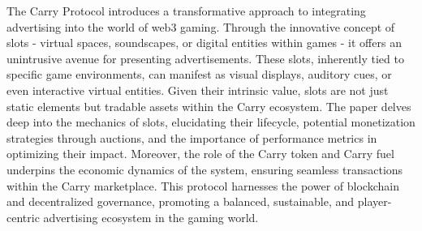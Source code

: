 \documentclass[
10pt, %
a4paper, %
oneside, %
headinclude,footinclude, %
BCOR5mm, %
]{scrartcl}
\begin{document}
The Carry Protocol introduces a transformative approach to integrating advertising into the world of web3 gaming. Through the innovative concept of slots - virtual spaces, soundscapes, or digital entities within games - it offers an unintrusive avenue for presenting advertisements. These slots, inherently tied to specific game environments, can manifest as visual displays, auditory cues, or even interactive virtual entities. Given their intrinsic value, slots are not just static elements but tradable assets within the Carry ecosystem. The paper delves deep into the mechanics of slots, elucidating their lifecycle, potential monetization strategies through auctions, and the importance of performance metrics in optimizing their impact. Moreover, the role of the Carry token and Carry fuel underpins the economic dynamics of the system, ensuring seamless transactions within the Carry marketplace. This protocol harnesses the power of blockchain and decentralized governance, promoting a balanced, sustainable, and player-centric advertising ecosystem in the gaming world.






\newpage %






% 

\end{document}
